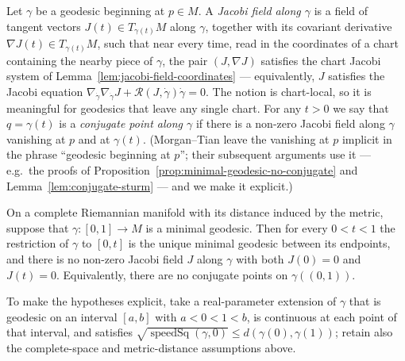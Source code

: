 \begin{definition}
\label{def:conjugate-point}




Let $\gamma$ be a geodesic beginning at $p\in M$. A {\sl Jacobi field
along $\gamma$} is a field of tangent vectors $J(t)\in T_{\gamma(t)}M$
along $\gamma$, together with its covariant derivative
$\nabla J(t)\in T_{\gamma(t)}M$, such that near every time, read in the
coordinates of a chart containing the nearby piece of $\gamma$, the pair
$(J,\nabla J)$ satisfies the chart Jacobi system of
Lemma~\ref{lem:jacobi-field-coordinates} — equivalently, $J$ satisfies
the Jacobi equation
$\nabla_{\dot\gamma}\nabla_{\dot\gamma}J
+{\mathcal R}(J,\dot\gamma)\dot\gamma=0$. The notion is chart-local, so
it is meaningful for geodesics that leave any single chart. For any
$t>0$ we say that $q=\gamma(t)$ is a {\sl conjugate point along
$\gamma$} if there is a non-zero Jacobi field
along $\gamma$ vanishing at $p$ and at $\gamma(t)$. (Morgan--Tian leave
the vanishing at $p$ implicit in the phrase ``geodesic beginning at
$p$''; their subsequent arguments use it — e.g.\ the proofs of
Proposition~\ref{prop:minimal-geodesic-no-conjugate} and
Lemma~\ref{lem:conjugate-sturm} — and we make it explicit.)
\end{definition}


\begin{proposition}
\label{prop:minimal-geodesic-no-conjugate}

\label{jacmin}



On a complete Riemannian manifold with its distance induced by the metric,
suppose that $\gamma\colon [0,1]\to M$ is a minimal geodesic. Then
for every $0<t<1$ the restriction of $\gamma$ to $[0,t]$ is the unique
minimal geodesic between its endpoints, and there is no non-zero Jacobi
field $J$ along $\gamma$ with both $J(0)=0$ and $J(t)=0$. Equivalently,
there are no conjugate points on $\gamma((0,1))$.

To make the hypotheses explicit, take a real-parameter extension of $\gamma$
that is geodesic on an interval $[a,b]$ with $a<0<1<b$, is continuous at
each point of that interval, and satisfies
$\sqrt{\operatorname{speedSq}(\gamma,0)}\le d(\gamma(0),\gamma(1))$;
retain also the complete-space and metric-distance assumptions above.
\end{proposition}

